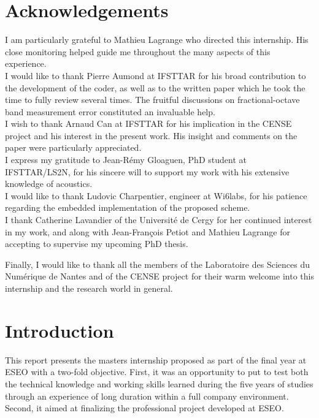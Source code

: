 \documentclass[12pt,times,onecolumn]{article}
\begin{document}



\section*{Acknowledgements}

I am particularly grateful to Mathieu Lagrange who directed this internship. His close monitoring helped guide me throughout the many aspects of this experience.\\

I would like to thank Pierre Aumond at IFSTTAR for his broad contribution to the development of the coder, as well as to the written paper which he took the time to fully review several times. The fruitful discussions on fractional-octave band measurement error constituted an invaluable help.\\

I wish to thank Arnaud Can at IFSTTAR for his implication in the CENSE project and his interest in the present work. His insight and comments on the paper were particularly appreciated.\\

I express my gratitude to Jean-Rémy Gloaguen, PhD student at IFSTTAR/LS2N, for his sincere will to support my work with his extensive knowledge of acoustics.\\

I would like to thank Ludovic Charpentier, engineer at Wi6labs, for his patience regarding the embedded implementation of the proposed scheme.\\

I thank Catherine Lavandier of the Universit\'e de Cergy for her continued interest in my work, and along with Jean-François Petiot and Mathieu Lagrange for accepting to supervise my upcoming PhD thesis.

Finally, I would like to thank all the members of the Laboratoire des Sciences du Num\'erique de Nantes and of the CENSE project for their warm welcome into this internship and the research world in general.




\clearpage
\section*{Introduction}
This report presents the masters internship proposed as part of the final year at ESEO with a two-fold objective. First, it was an opportunity to put to test both the technical knowledge and working skills learned during the five years of studies through an experience of long duration within a full company environment. Second, it aimed at finalizing the professional project developed at ESEO.\\
\end{document}
